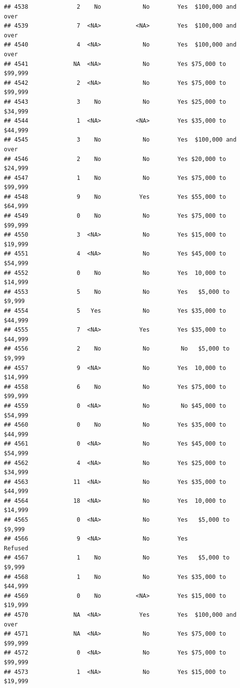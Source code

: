 \documentclass[man]{apa6}
\begin{document}
\begin{verbatim}
## 4538              2    No            No        Yes  $100,000 and over
## 4539              7  <NA>          <NA>        Yes  $100,000 and over
## 4540              4  <NA>            No        Yes  $100,000 and over
## 4541             NA  <NA>            No        Yes $75,000 to $99,999
## 4542              2  <NA>            No        Yes $75,000 to $99,999
## 4543              3    No            No        Yes $25,000 to $34,999
## 4544              1  <NA>          <NA>        Yes $35,000 to $44,999
## 4545              3    No            No        Yes  $100,000 and over
## 4546              2    No            No        Yes $20,000 to $24,999
## 4547              1    No            No        Yes $75,000 to $99,999
## 4548              9    No           Yes        Yes $55,000 to $64,999
## 4549              0    No            No        Yes $75,000 to $99,999
## 4550              3  <NA>            No        Yes $15,000 to $19,999
## 4551              4  <NA>            No        Yes $45,000 to $54,999
## 4552              0    No            No        Yes  10,000 to $14,999
## 4553              5    No            No        Yes   $5,000 to $9,999
## 4554              5   Yes            No        Yes $35,000 to $44,999
## 4555              7  <NA>           Yes        Yes $35,000 to $44,999
## 4556              2    No            No         No   $5,000 to $9,999
## 4557              9  <NA>            No        Yes  10,000 to $14,999
## 4558              6    No            No        Yes $75,000 to $99,999
## 4559              0  <NA>            No         No $45,000 to $54,999
## 4560              0    No            No        Yes $35,000 to $44,999
## 4561              0  <NA>            No        Yes $45,000 to $54,999
## 4562              4  <NA>            No        Yes $25,000 to $34,999
## 4563             11  <NA>            No        Yes $35,000 to $44,999
## 4564             18  <NA>            No        Yes  10,000 to $14,999
## 4565              0  <NA>            No        Yes   $5,000 to $9,999
## 4566              9  <NA>            No        Yes            Refused
## 4567              1    No            No        Yes   $5,000 to $9,999
## 4568              1    No            No        Yes $35,000 to $44,999
## 4569              0    No          <NA>        Yes $15,000 to $19,999
## 4570             NA  <NA>           Yes        Yes  $100,000 and over
## 4571             NA  <NA>            No        Yes $75,000 to $99,999
## 4572              0  <NA>            No        Yes $75,000 to $99,999
## 4573              1  <NA>            No        Yes $15,000 to $19,999

\end{verbatim}
\end{document}
